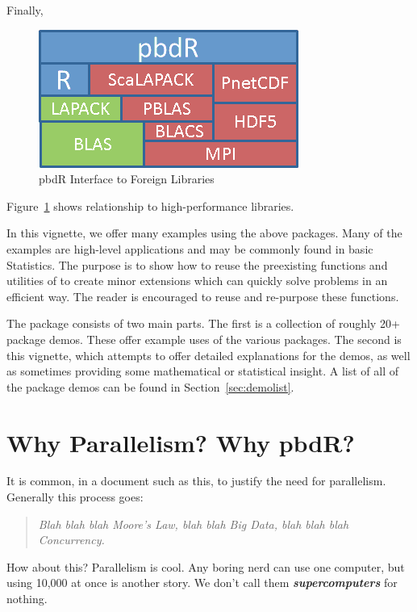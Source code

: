 Finally, 
\begin{figure}[h]
 \centering
 \includegraphics[scale=.85]{pbdDEMO-include/pics/libs.png}
 \caption{pbdR Interface to Foreign Libraries}
 \label{fig:pbdrlibs}
\end{figure}
Figure~\ref{fig:pbdrlibs} shows \pbdR relationship to
high-performance libraries.

In this vignette, we offer many examples using the above \pbdR
packages. Many of the examples are high-level applications and may be commonly
found in basic Statistics. The purpose is to show how to reuse the
preexisting functions and utilities of \pbdR to create minor
extensions which can quickly solve problems in an efficient way.
The reader is encouraged to reuse and re-purpose these functions.

The  package consists of two main parts. The first is a
collection of roughly 20+ package demos. These offer example uses of
the various \pbdR packages. The second is this vignette, which
attempts to offer detailed explanations for the demos, as well as sometimes
providing some mathematical or statistical insight. A list of all of the
package demos can be found in Section~\ref{sec:demolist}.



\section{Why Parallelism?  Why pbdR?}

It is common, in a document such as this, to justify the need for parallelism.
Generally this process goes:

\begin{quote}
\emph{
Blah blah blah Moore's Law, blah blah Big Data, blah blah blah Concurrency.
}
\end{quote}

How about this? Parallelism is cool. Any boring nerd can use one computer,
but using 10,000 at once is another story. We don't call them
\emph{\textbf{supercomputers}} for nothing.

